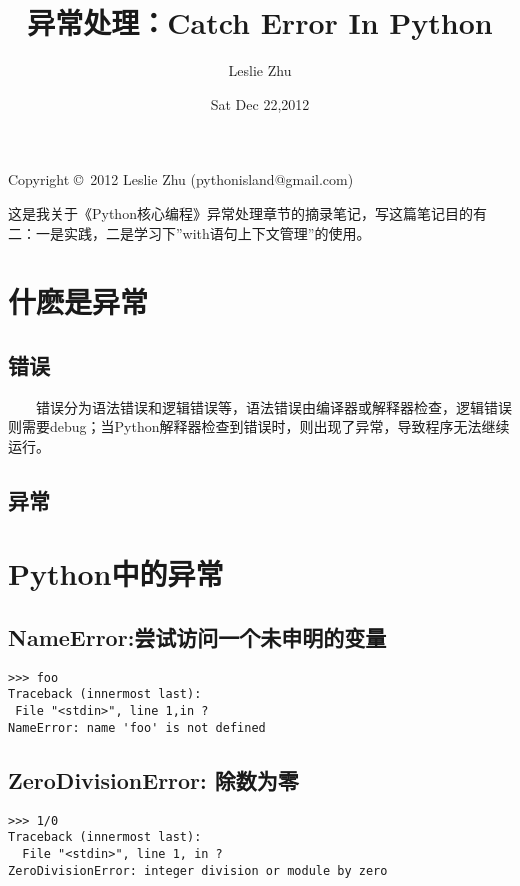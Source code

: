 \documentclass[11pt,a4paper]{article}
\begin{document}
\begin{CJK*}{UTF8}{nsung}

\title{异常处理：Catch Error In Python}
\date{Sat Dec 22,2012}
\author{Leslie Zhu}
\maketitle

\begin{center}
Copyright \copyright \ 2012 Leslie Zhu (pythonisland@gmail.com)
\end{center}

\newpage

这是我关于《Python核心编程》异常处理章节的摘录笔记，写这篇笔记目的有二：一是实践，二是学习下''with语句上下文管理''的使用。\par

\section{什麽是异常}

\subsection{错误}
~~~~错误分为语法错误和逻辑错误等，语法错误由编译器或解释器检查，逻辑错误则需要debug；当Python解释器检查到错误时，则出现了异常，导致程序无法继续运行。\par
\subsection{异常}

\section{Python中的异常}

\subsection{NameError:尝试访问一个未申明的变量}
\begin{verbatim}
>>> foo
Traceback (innermost last):
 File "<stdin>", line 1,in ?
NameError: name 'foo' is not defined
\end{verbatim}

\subsection{ZeroDivisionError: 除数为零}
\begin{verbatim}
>>> 1/0
Traceback (innermost last):
  File "<stdin>", line 1, in ?
ZeroDivisionError: integer division or module by zero
\end{verbatim}


\end{CJK*}
\end{document}
